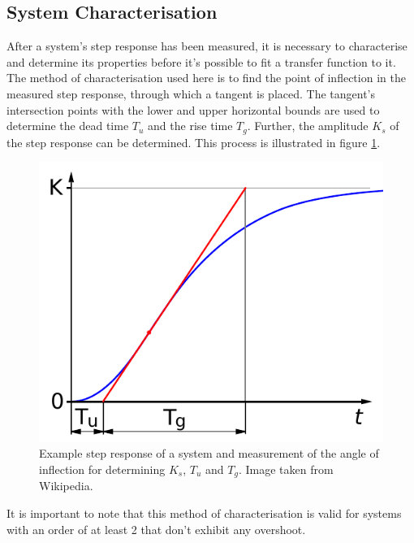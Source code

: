 \subsection{System Characterisation}

After  a system's  step  response  has  been  measured,  it  is  necessary  to
characterise  and  determine  its  properties before it's possible  to  fit  a
transfer function to it. The method  of  characterisation used here is to find
the point of inflection in the measured step response, through which a tangent
is placed.  The  tangent's  intersection  points  with  the  lower  and  upper
horizontal bounds  are used to determine the dead time $T_u$ and the rise time
$T_g$.  Further, the amplitude $K_s$ of the step response can  be  determined.
This process is illustrated in figure \ref{fig:tu-tg-example}.

\begin{figure}[t]
    \centering
    \includegraphics[width=\imagewidth]{images/tu_tg_example}
    \caption{Example step response of a system and measurement of the angle of inflection for determining $K_s$, $T_u$ and $T_g$. Image taken from Wikipedia\cite{ref:tu-tg}.}
    \label{fig:tu-tg-example}
\end{figure}

It is important to note that this method  of  characterisation  is  valid  for
systems  with  an  order of at least  2  that  don't  exhibit  any  overshoot.

